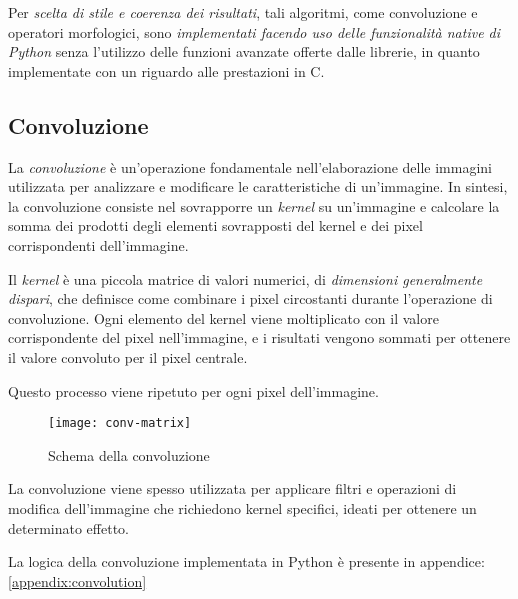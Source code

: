 Per \textit{scelta di stile e coerenza dei risultati}, tali algoritmi, come convoluzione e operatori morfologici, sono \textit{implementati facendo uso delle funzionalità native di Python} senza l'utilizzo delle funzioni avanzate offerte dalle librerie, in quanto implementate con un riguardo alle prestazioni in C.
\newpage

\subsection{Convoluzione}
La \textit{convoluzione} è un'operazione fondamentale nell'elaborazione delle immagini utilizzata per analizzare e modificare le caratteristiche di un'immagine. In sintesi, la convoluzione consiste nel sovrapporre un \textit{kernel} su un'immagine e calcolare la somma dei prodotti degli elementi sovrapposti del kernel e dei pixel corrispondenti dell'immagine.

Il \textit{kernel} è una piccola matrice di valori numerici, di \textit{dimensioni generalmente dispari}, che definisce come combinare i pixel circostanti durante l'operazione di convoluzione. Ogni elemento del kernel viene moltiplicato con il valore corrispondente del pixel nell'immagine, e i risultati vengono sommati per ottenere il valore convoluto per il pixel centrale.

Questo processo viene ripetuto per ogni pixel dell'immagine.

 \begin{figure}[H]
	\centering
	\texttt{[image: conv-matrix]}
	\caption{Schema della convoluzione}
\end{figure}

\noindent La convoluzione viene spesso utilizzata per applicare filtri e operazioni di modifica dell'immagine che richiedono kernel specifici, ideati per ottenere un determinato effetto.

La logica della convoluzione implementata in Python è presente in appendice: \ref{appendix:convolution}

